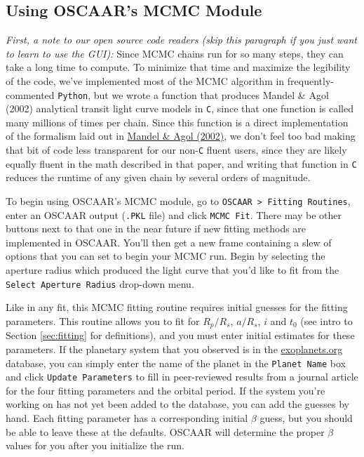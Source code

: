 \documentclass[a4paper]{article}
\newcommand{\code}[1]{\texttt{#1}}
\begin{document}
\subsection{Using OSCAAR's MCMC Module}

\textit{First, a note to our open source code readers (skip this paragraph if you just want to learn to use the GUI):} Since MCMC chains run for so many steps, they can take a long time to compute. To minimize that time and maximize the legibility of the code, we've implemented most of the MCMC algorithm in frequently-commented \code{Python}, but we wrote a function that produces Mandel \& Agol (2002) analytical transit light curve models in \code{C}, since that one function is called many millions of times per chain. Since this function is a direct implementation of the formalism laid out in \href{http://adsabs.harvard.edu/abs/2002ApJ...580L.171M}{Mandel \& Agol (2002)}, we don't feel too bad making that bit of code less transparent for our non-\code{C} fluent users, since they are likely equally fluent in the math described in that paper, and writing that function in \code{C} reduces the runtime of any given chain by several orders of magnitude.  

To begin using OSCAAR's MCMC module, go to \code{OSCAAR > Fitting Routines}, enter an OSCAAR output (\code{.PKL} file) and click \code{MCMC Fit}. There may be other buttons next to that one in the near future if new fitting methods are implemented in OSCAAR. You'll then get a new frame containing a slew of options that you can set to begin your MCMC run. Begin by selecting the aperture radius which produced the light curve that you'd like to fit from the \code{Select Aperture Radius} drop-down menu.

Like in any fit, this MCMC fitting routine requires initial guesses for the fitting parameters. This routine allows you to fit for $R_p/R_s$, $a/R_s$, $i$ and $t_0$ (see intro to Section \ref{sec:fitting} for definitions), and you must enter initial estimates for these parameters. If the planetary system that you observed is in the \href{http://www.exoplanets.org/table}{exoplanets.org} database, you can simply enter the name of the planet in the \code{Planet Name} box and click \code{Update Parameters} to fill in peer-reviewed results from a journal article for the four fitting parameters and the orbital period. If the system you're working on has not yet been added to the database, you can add the guesses by hand. Each fitting parameter has a corresponding initial $\beta$ guess, but you should be able to leave these at the defaults. OSCAAR will determine the proper $\beta$ values for you after you initialize the run.
\end{document}
